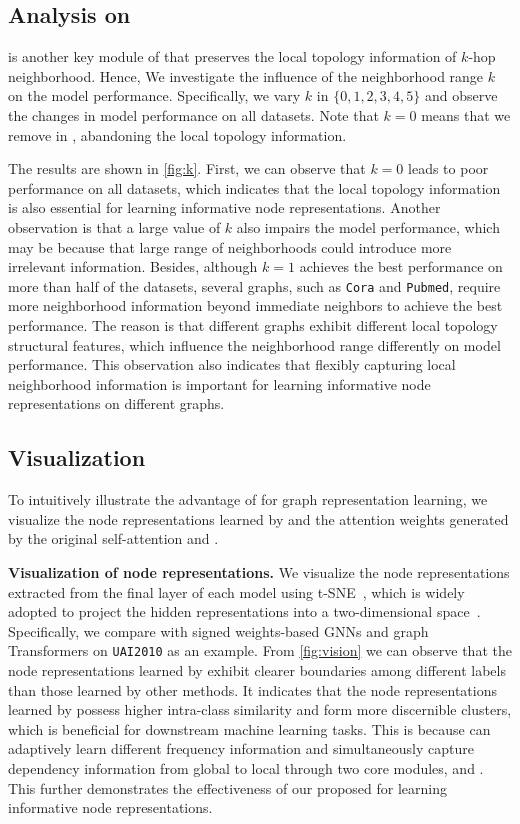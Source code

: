 \documentclass[sigconf, screen]{acmart}
\begin{document}
\subsection{Analysis on  \sffn}
\sffn is another key module of \name that preserves the local topology information of $k$-hop neighborhood.
Hence, We investigate the influence of the neighborhood range $k$ on the model performance.
Specifically, we vary $k$ in $\{0, 1, 2, 3, 4, 5\}$ and observe the changes in model performance on all datasets.
Note that $k=0$ means that we remove \sffn in \name, abandoning the local topology information.

The results are shown in \autoref{fig:k}.
First, we can observe that $k=0$ leads to poor performance on all datasets, which indicates that the local topology information is also essential for learning informative node representations.
Another observation is that a large value of $k$ also impairs the model performance, which may be because that large range of neighborhoods could introduce more irrelevant information. 
Besides, although $k=1$ achieves the best performance on more than half of the datasets, several graphs, such as \texttt{Cora} and \texttt{Pubmed}, require more neighborhood information beyond immediate neighbors to achieve the best performance.
The reason is that different graphs exhibit different local topology structural features, which influence the neighborhood range differently on model performance.
This observation also indicates that flexibly capturing local neighborhood information is important for learning informative node representations on different graphs.


\subsection{Visualization}
To intuitively illustrate the advantage of \name for graph representation learning, we visualize the node representations learned by \name and the attention weights generated by the original self-attention and \saname.

\textbf{Visualization of node representations.}
We visualize the node representations extracted from the final layer of each model using t-SNE~\cite{tsne}, which is widely adopted to project the hidden representations into a two-dimensional space~\cite{bmgcn}.
Specifically, we compare \name with signed weights-based GNNs and graph Transformers on \texttt{UAI2010} as an example.
From \autoref{fig:vision} we can observe that the node representations learned by \name exhibit clearer boundaries among different labels than those learned by other methods.
It indicates that the node representations learned by \name possess higher intra-class similarity and form more discernible clusters, which is beneficial for downstream machine learning tasks.
This is because \name can adaptively learn different frequency information and simultaneously capture dependency information from global to local through two core modules, \saname and \sffn.
This further demonstrates the effectiveness of our proposed \name for learning informative node representations.
\end{document}
